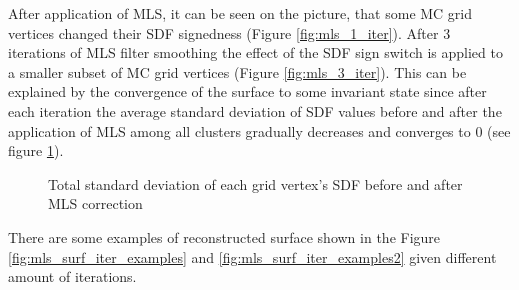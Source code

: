 After application of MLS, it can be seen on the picture, that some MC grid vertices changed their SDF signedness (Figure \ref{fig:mls_1_iter}). After 3 iterations of MLS filter smoothing the effect of the SDF sign switch is applied to a smaller subset of MC grid vertices (Figure \ref{fig:mls_3_iter}). This can be explained by the convergence of the surface to some invariant state since after each iteration the average standard deviation of SDF values before and after the application of MLS among all clusters gradually decreases and converges to 0 (see figure \ref{fig:mls_std_dev}).
\begin{figure}[h]
	\begin{center}
	\end{center}
	\caption{Total standard deviation of each grid vertex's SDF before and after MLS correction}
	\label{fig:mls_std_dev}
\end{figure}
There are some examples of reconstructed surface shown in the Figure \ref{fig:mls_surf_iter_examples} and \ref{fig:mls_surf_iter_examples2} given different amount of iterations.
